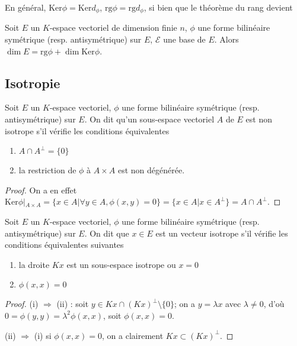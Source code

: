 \begin{rem}
En général, $\mathrm{Ker} \phi = \mathrm{Ker} d_\phi$, $\mathrm{rg} \phi = \mathrm{rg} d_\phi$, si bien que le théorème du rang devient
\end{rem}

\begin{prop}
Soit $E$ un $K$-espace vectoriel de dimension finie $n$, $\phi$ une forme bilinéaire symétrique (resp. antisymétrique) sur $E$, $\mathcal{E}$ une base de $E$. Alors $\dim E = \mathrm{rg} \phi + \dim \mathrm{Ker} \phi$.
\end{prop}

\subsection{Isotropie}

\begin{de}
Soit $E$ un $K$-espace vectoriel, $\phi$ une forme bilinéaire symétrique (resp. antisymétrique) sur $E$. On dit qu'un sous-espace vectoriel $A$ de $E$ est non isotrope s'il vérifie les conditions équivalentes
\begin{enumerate}
\item $A \cap A^\bot = \{0\}$
\item la restriction de $\phi$ à $A \times A$ est non dégénérée.
\end{enumerate}
\end{de}

\begin{proof}
On a en effet $\mathrm{Ker} \phi|_{A \times A} = \{x \in A | \forall y \in A, \phi(x,y) = 0\} = \{x \in A | x \in A^\bot\} = A \cap A^\bot$.
\end{proof}

\begin{de}
Soit $E$ un $K$-espace vectoriel, $\phi$ une forme bilinéaire symétrique (resp. antisymétrique) sur $E$. On dit que $x \in E$ est un vecteur isotrope s'il vérifie les conditions équivalentes suivantes
\begin{enumerate}
\item la droite $Kx$ est un sous-espace isotrope ou $x = 0$
\item $\phi(x,x) = 0$
\end{enumerate}
\end{de}

\begin{proof}
(i) $\Rightarrow$ (ii) : soit $y \in Kx \cap (Kx)^\bot \setminus \{0\}$; on a $y = \lambda x$ avec $\lambda \neq 0$, d'où $0 = \phi(y,y) = \lambda^2 \phi(x,x)$, soit $\phi(x,x) = 0$.

(ii) $\Rightarrow$ (i) si $\phi(x,x) = 0$, on a clairement $Kx \subset (Kx)^\bot$.
\end{proof}

